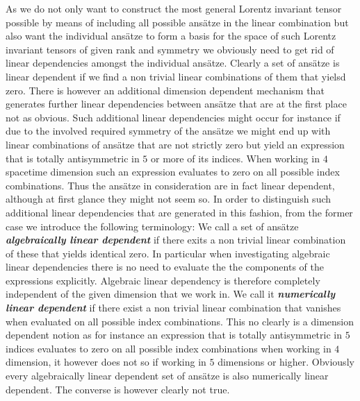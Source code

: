 \documentclass[a4paper,12pt, DIV=14, BCOR=5mm, twoside, headsepline]{scrbook}
\begin{document}
As we do not only want to construct the most general Lorentz invariant tensor possible by means of including all possible ansätze in the linear combination but also want the individual ansätze to form a basis for the space of such Lorentz invariant tensors of given rank and symmetry we obviously need to get rid of linear dependencies amongst the individual ansätze. Clearly a set of ansätze is linear dependent if we find a non trivial linear combinations of them that yielsd zero. 
There is however an additional dimension dependent mechanism that generates further linear dependencies between ansätze that are at the first place not as obvious. Such additional linear dependencies might occur for instance if due to the involved required symmetry of the ansätze we might end up with linear combinations of ansätze that are not strictly zero but yield an expression that is totally antisymmetric in $5$ or more of its indices. When working in $4$ spacetime dimension such an expression evaluates to zero on all possible index combinations. Thus the ansätze in consideration are in fact linear dependent, although at first glance they might not seem so. In order to distinguish such additional linear dependencies that are generated in this fashion, from the former case we introduce the following terminology: We call a set of ansätze \textit{\textbf{algebraically linear dependent}} if there exits a non trivial linear combination of these that yields identical zero. In particular when investigating algebraic linear dependencies there is no need to evaluate the the components of the expressions explicitly. Algebraic linear dependency is therefore completely independent of the given dimension that we work in. We call it \textbf{\textit{numerically linear dependent}} if there exist a non trivial linear combination that vanishes when evaluated on all possible index combinations. This no clearly is a dimension dependent notion as for instance an expression that is totally antisymmetric in $5$ indices evaluates to zero on all possible index combinations when working in $4$ dimension, it however does not so if working in $5$ dimensions or higher. Obviously every algebraically linear dependent set of ansätze is also numerically linear dependent. The converse is however clearly not true.
\end{document}
